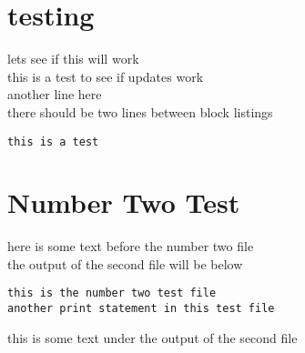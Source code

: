 \documentclass{report}
\begin{document}
\section{testing}
lets see if this will work\\
this is a test to see if updates work\\

another line here\\
there should be two lines between block listings\\
\begin{lstlisting}
this is a test

\end{lstlisting}

\section{Number Two Test}
here is some text before the number two file\\

the output of the second file will be below\\
\begin{lstlisting}
this is the number two test file
another print statement in this test file

\end{lstlisting}

this is some text under the output of the second file
\end{document}
